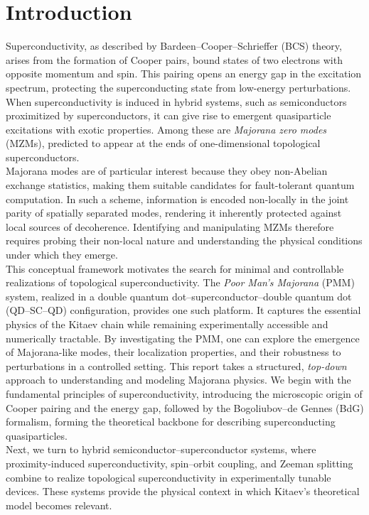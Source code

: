 \documentclass[11pt, letterpaper, titlepage]{article}
\begin{document}
\section{Introduction}
Superconductivity, as described by Bardeen–Cooper–Schrieffer (BCS) theory, arises from the formation of Cooper pairs, bound states of two electrons with opposite momentum and spin. This pairing opens an energy gap in the excitation spectrum, protecting the superconducting state from low-energy perturbations. When superconductivity is induced in hybrid systems, such as semiconductors proximitized by superconductors, it can give rise to emergent quasiparticle excitations with exotic properties. Among these are \textit{Majorana zero modes} (MZMs), predicted to appear at the ends of one-dimensional topological superconductors.\\
Majorana modes are of particular interest because they obey non-Abelian exchange statistics, making them suitable candidates for fault-tolerant quantum computation. In such a scheme, information is encoded non-locally in the joint parity of spatially separated modes, rendering it inherently protected against local sources of decoherence. Identifying and manipulating MZMs therefore requires probing their non-local nature and understanding the physical conditions under which they emerge.\\  
This conceptual framework motivates the search for minimal and controllable realizations of topological superconductivity. The \textit{Poor Man’s Majorana} (PMM) system, realized in a double quantum dot–superconductor–double quantum dot (QD–SC–QD) configuration, provides one such platform. It captures the essential physics of the Kitaev chain while remaining experimentally accessible and numerically tractable. By investigating the PMM, one can explore the emergence of Majorana-like modes, their localization properties, and their robustness to perturbations in a controlled setting.
\vspace{0.5em}
This report takes a structured, \textit{top-down} approach to understanding and modeling Majorana physics. We begin with the fundamental principles of superconductivity, introducing the microscopic origin of Cooper pairing and the energy gap, followed by the Bogoliubov–de Gennes (BdG) formalism, forming the theoretical backbone for describing superconducting quasiparticles.\\  
Next, we turn to hybrid semiconductor–superconductor systems, where proximity-induced superconductivity, spin–orbit coupling, and Zeeman splitting combine to realize topological superconductivity in experimentally tunable devices. These systems provide the physical context in which Kitaev’s theoretical model becomes relevant.\\
\end{document}
